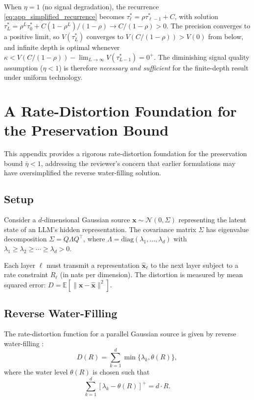 \begin{remark}
When $\eta = 1$ (no signal degradation), the recurrence \eqref{eq:app_simplified_recurrence} becomes $\tau^{*}_{\ell} = \rho \tau^{*}_{\ell-1} + C$, with solution $\tau^{*}_{L} = \rho^{L}\tau^{*}_{0} + C(1-\rho^{L})/(1-\rho) \to C/(1-\rho) > 0$. The precision converges to a positive limit, so $V(\tau^{*}_{L})$ converges to $V(C/(1-\rho)) > V(0)$ from below, and infinite depth is optimal whenever $\kappa < V(C/(1-\rho)) - \lim_{L\to\infty}V(\tau^{*}_{L-1}) = 0^{+}$. The diminishing signal quality assumption ($\eta < 1$) is therefore \emph{necessary and sufficient} for the finite-depth result under uniform technology.
\end{remark}

\section{A Rate-Distortion Foundation for the Preservation Bound}
\label{app:rate_distortion}

This appendix provides a rigorous rate-distortion foundation for the preservation bound $\bar{\eta} < 1$, addressing the reviewer's concern that earlier formulations may have oversimplified the reverse water-filling solution.

\subsection{Setup}

Consider a $d$-dimensional Gaussian source $\mathbf{x} \sim \mathcal{N}(0, \Sigma)$ representing the latent state of an LLM's hidden representation. The covariance matrix $\Sigma$ has eigenvalue decomposition $\Sigma = Q \Lambda Q^{\top}$, where $\Lambda = \text{diag}(\lambda_1, \ldots, \lambda_d)$ with $\lambda_1 \geq \lambda_2 \geq \cdots \geq \lambda_d > 0$.

Each layer $\ell$ must transmit a representation $\hat{\mathbf{x}}_\ell$ to the next layer subject to a rate constraint $R_\ell$ (in nats per dimension). The distortion is measured by mean squared error: $D = \mathbb{E}[\|\mathbf{x} - \hat{\mathbf{x}}\|^2]$.

\subsection{Reverse Water-Filling}

The rate-distortion function for a parallel Gaussian source is given by reverse water-filling \citep{cover1999elements}:
\begin{equation}\label{eq:reverse_water_filling}
D(R) = \sum_{k=1}^{d} \min\{\lambda_k, \theta(R)\},
\end{equation}
where the water level $\theta(R)$ is chosen such that
\begin{equation}\label{eq:water_level}
\sum_{k=1}^{d} [\lambda_k - \theta(R)]^{+} = d \cdot R.
\end{equation}

